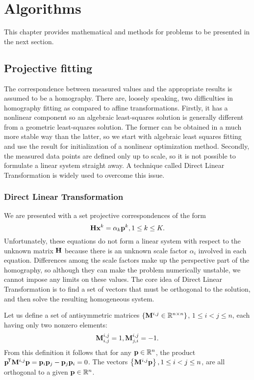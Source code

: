 \chapter{Algorithms}

This chapter provides mathematical and  methods for problems to be presented in the next section.

\section{Projective fitting}

The correspondence between measured values and the appropriate results is assumed to be a homography.
There are, loosely speaking, two difficulties in homography fitting as compared to affine transformations.
Firstly, it has a nonlinear component so an algebraic least-squares solution is generally different from a geometric least-squares solution.
The former can be obtained in a much more stable way than the latter, so we start with algebraic least squares fitting and use the result for initialization of a nonlinear optimization method.
Secondly, the measured data points are defined only up to scale, so it is not possible to formulate a linear system straight away.
A technique called Direct Linear Transformation is widely used to overcome this issue.

\subsection{Direct Linear Transformation}

We are presented with a set projective correspondences of the form
$$\mathbf{H} \mathbf{x}^k = \alpha_k \mathbf{p}^k, 1 \leq k \leq K.$$
Unfortunately, these equations do not form a linear system with respect to the unknown matrix $\mathbf{H}$ because there is an unknown scale factor $\alpha_i$ involved in each equation.
Differences among the scale factors make up the perspective part of the homography, so although they can make the problem numerically unstable, we cannot impose any limits on these values.
The core idea of Direct Linear Transformation is to find a set of vectors that must be orthogonal to the solution, and then solve the resulting homogeneous system.

Let us define a set of antisymmetric matrices $\{\mathbf{M}^{i, j} \in \mathbb{R}^{n \times n}\}$, $1 \leq i < j \leq n$, each having only two nonzero elements:
$$\mathbf{M}^{i, j}_{i, j} = 1,
\mathbf{M}^{i, j}_{j, i} = -1.$$
From this definition it follows that for any $\mathbf{p} \in \mathbb{R}^n$, the product $\mathbf{p}^{\!\mathsf{T}} \mathbf{M}^{i, j} \mathbf{p} = \mathbf{p}_{i} \mathbf{p}_{j} - \mathbf{p}_{j} \mathbf{p}_{i} = 0$.
The vectors $\left\{ \mathbf{M}^{i, j} \mathbf{p} \right\}, 1 \leq i < j \leq n$, are all orthogonal to a given $\mathbf{p} \in \mathbb{R}^n$.


